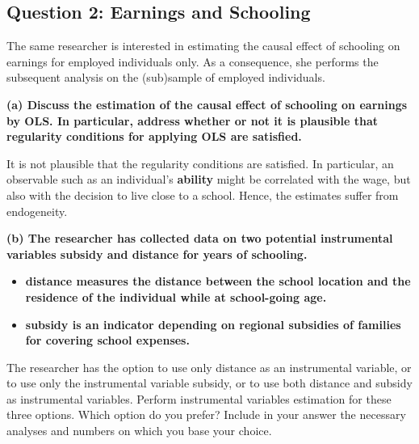 \documentclass[
]{article}
\providecommand{\tightlist}{%
  \setlength{\itemsep}{0pt}\setlength{\parskip}{0pt}}
\begin{document}
\clearpage

\hypertarget{question-2-earnings-and-schooling}{%
\subsection{Question 2: Earnings and
Schooling}\label{question-2-earnings-and-schooling}}

The same researcher is interested in estimating the causal effect of
schooling on earnings for employed individuals only. As a consequence,
she performs the subsequent analysis on the (sub)sample of employed
individuals.

\textbf{(a) Discuss the estimation of the causal effect of schooling on
earnings by OLS. In particular, address whether or not it is plausible
that regularity conditions for applying OLS are satisfied.}

It is not plausible that the regularity conditions are satisfied. In
particular, an observable such as an individual's \textbf{ability} might
be correlated with the wage, but also with the decision to live close to
a school. Hence, the estimates suffer from endogeneity.

\textbf{(b) The researcher has collected data on two potential
instrumental variables subsidy and distance for years of schooling.}

\begin{itemize}
\tightlist
\item
  \textbf{distance measures the distance between the school location and
  the residence of the individual while at school-going age.}
\item
  \textbf{subsidy is an indicator depending on regional subsidies of
  families for covering school expenses.}
\end{itemize}

The researcher has the option to use only distance as an instrumental
variable, or to use only the instrumental variable subsidy, or to use
both distance and subsidy as instrumental variables. Perform
instrumental variables estimation for these three options. Which option
do you prefer? Include in your answer the necessary analyses and numbers
on which you base your choice.
\end{document}
